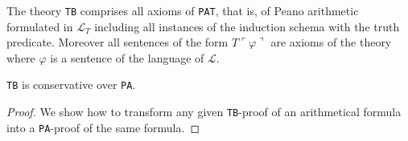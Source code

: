 %

\begin{definition}[\texttt{TB}]
    \label{def:TB}
    The theory \texttt{TB} comprises all axioms of \texttt{PAT}, that is, of Peano arithmetic formulated in $\mathcal{L}_T$ including all instances of the induction schema with the truth predicate. Moreover all sentences of the form $T\ulcorner\varphi\urcorner$ are axioms of the theory where $\varphi$ is a sentence of the language of $\mathcal{L}$.
\end{definition}

\begin{theorem}
    \label{thm:tb-cons}
    \texttt{TB} is conservative over \texttt{PA}.
\end{theorem}

\begin{proof}  We show how to transform any given \texttt{TB}-proof of an arithmetical formula into a \texttt{PA}-proof of the same formula. 

\end{proof}
